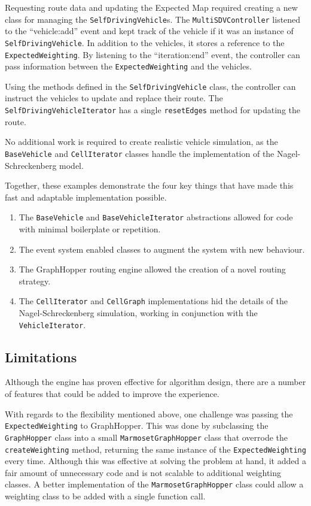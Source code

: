 \documentclass[ %
                    author={Alexander Hill},
                supervisor={Dr. Benjamin Sach},
                    degree={MEng},
                     title={MARMOSET},
                  subtitle={Multi-Agent Route Management using Online Simulation for Efficient Transportation},
                      type={research},
                      year={2016} ]{dissertation}
\begin{document}
Requesting route data and updating the Expected Map required creating a new
class for managing the \texttt{SelfDrivingVehicle}s. The
\texttt{MultiSDVController} listened to the ``vehicle:add'' event and kept track
of the vehicle if it was an instance of \texttt{SelfDrivingVehicle}. In addition
to the vehicles, it stores a reference to the \texttt{ExpectedWeighting}. By
listening to the ``iteration:end'' event, the controller can pass information
between the \texttt{ExpectedWeighting} and the vehicles.

Using the methods defined in the \texttt{SelfDrivingVehicle} class, the
controller can instruct the vehicles to update and replace their route. The
\texttt{SelfDrivingVehicleIterator} has a single \texttt{resetEdges} method for
updating the route.

No additional work is required to create realistic vehicle simulation, as the
\texttt{BaseVehicle} and \texttt{CellIterator} classes handle the implementation
of the Nagel-Schreckenberg model.

Together, these examples demonstrate the four key things that have made this
fast and adaptable implementation possible.

\begin{enumerate}
    \item The \texttt{BaseVehicle} and \texttt{BaseVehicleIterator} abstractions
        allowed for code with minimal boilerplate or repetition.
    \item The event system enabled classes to augment the system with new
        behaviour.
    \item The GraphHopper routing engine allowed the creation of a novel
        routing strategy.
    \item The \texttt{CellIterator} and \texttt{CellGraph} implementations
        hid the details of the Nagel-Schreckenberg simulation, working in
        conjunction with the \texttt{VehicleIterator}.
\end{enumerate}

\subsection{Limitations}

Although the engine has proven effective for algorithm design, there are a
number of features that could be added to improve the experience.

With regards to the flexibility mentioned above, one challenge was passing
the \texttt{ExpectedWeighting} to GraphHopper. This was done by subclassing the
\texttt{GraphHopper} class into a small \texttt{MarmosetGraphHopper} class that
overrode the \texttt{createWeighting} method, returning the same instance of the
\texttt{ExpectedWeighting} every time. Although this was effective at solving
the problem at hand, it added a fair amount of unnecessary code and is not
scalable to additional weighting classes. A better implementation of the
\texttt{MarmosetGraphHopper} class could allow a weighting class
to be added with a single function call.
\end{document}
